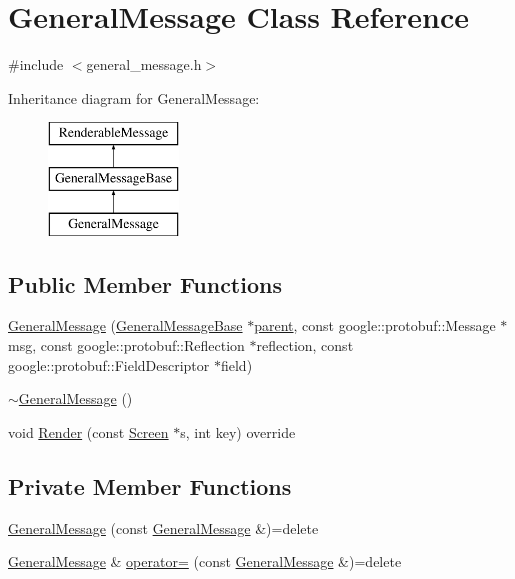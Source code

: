 \hypertarget{classGeneralMessage}{\section{General\-Message Class Reference}
\label{classGeneralMessage}
}


{\ttfamily \#include $<$general\-\_\-message.\-h$>$}

Inheritance diagram for General\-Message\-:\begin{figure}[H]
\begin{center}
\leavevmode
\includegraphics[height=3.000000cm]{classGeneralMessage}
\end{center}
\end{figure}
\subsection*{Public Member Functions}
\begin{DoxyCompactItemize}
\item 
\hyperlink{classGeneralMessage_ab1c0ee4586ae031d955533780f0e1dae}{General\-Message} (\hyperlink{classGeneralMessageBase}{General\-Message\-Base} $\ast$\hyperlink{classRenderableMessage_ab23728d14d9aff3efa0af7639ec6059c}{parent}, const google\-::protobuf\-::\-Message $\ast$msg, const google\-::protobuf\-::\-Reflection $\ast$reflection, const google\-::protobuf\-::\-Field\-Descriptor $\ast$field)
\item 
\hyperlink{classGeneralMessage_abc6d0f99cd6edc640027df3929628b36}{$\sim$\-General\-Message} ()
\item 
void \hyperlink{classGeneralMessage_a382210348f197d8b83a3d5a795e04852}{Render} (const \hyperlink{classScreen}{Screen} $\ast$s, int key) override
\end{DoxyCompactItemize}
\subsection*{Private Member Functions}
\begin{DoxyCompactItemize}
\item 
\hyperlink{classGeneralMessage_ad7972b90bd017a6993fe6585aa1227b2}{General\-Message} (const \hyperlink{classGeneralMessage}{General\-Message} \&)=delete
\item 
\hyperlink{classGeneralMessage}{General\-Message} \& \hyperlink{classGeneralMessage_a21635e2f4d5c9da0200db43add363383}{operator=} (const \hyperlink{classGeneralMessage}{General\-Message} \&)=delete
\end{DoxyCompactItemize}
